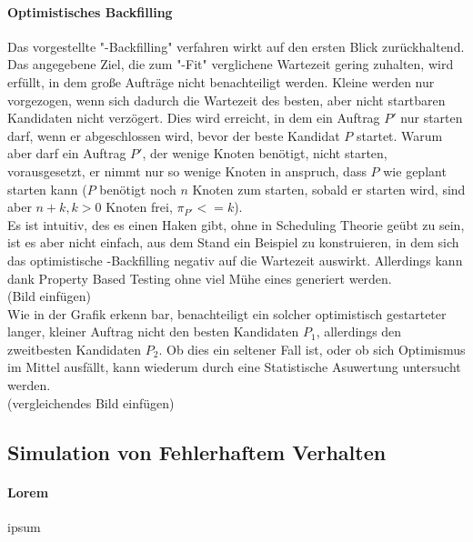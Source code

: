 \paragraph{Optimistisches Backfilling}
Das vorgestellte "-Backfilling" verfahren wirkt auf den ersten Blick zurückhaltend. Das angegebene Ziel, die zum "-Fit" verglichene Wartezeit gering zuhalten, wird erfüllt, in dem große Aufträge nicht benachteiligt werden. Kleine werden nur vorgezogen, wenn sich dadurch die Wartezeit des besten, aber nicht startbaren Kandidaten nicht verzögert. Dies wird erreicht, in dem ein Auftrag $P'$ nur starten darf, wenn er abgeschlossen wird, bevor der beste Kandidat $P$ startet. Warum aber darf ein Auftrag $P'$, der wenige Knoten benötigt, nicht starten, vorausgesetzt, er nimmt nur so wenige Knoten in anspruch, dass $P$ wie geplant starten kann ($P$ benötigt noch $n$ Knoten zum starten, sobald er starten wird, sind aber $n+k, k>0$ Knoten frei, $\pi_{P'} <= k$).\\
Es ist intuitiv, des es einen Haken gibt, ohne in Scheduling Theorie geübt zu sein, ist es aber nicht einfach, aus dem Stand ein Beispiel zu konstruieren, in dem sich das optimistische -Backfilling negativ auf die Wartezeit auswirkt. Allerdings kann dank Property Based Testing ohne viel Mühe eines generiert werden.
\\(Bild einfügen)
\\Wie in der Grafik erkenn bar, benachteiligt ein solcher optimistisch gestarteter langer, kleiner Auftrag nicht den besten Kandidaten $P_1$, allerdings den zweitbesten Kandidaten $P_2$. Ob dies ein seltener Fall ist, oder ob sich Optimismus im Mittel ausfällt, kann wiederum durch eine Statistische Asuwertung untersucht werden.
\\(vergleichendes Bild einfügen)

\subsection{Simulation von Fehlerhaftem Verhalten}
\label{simErrors}

\paragraph{Lorem}
ipsum